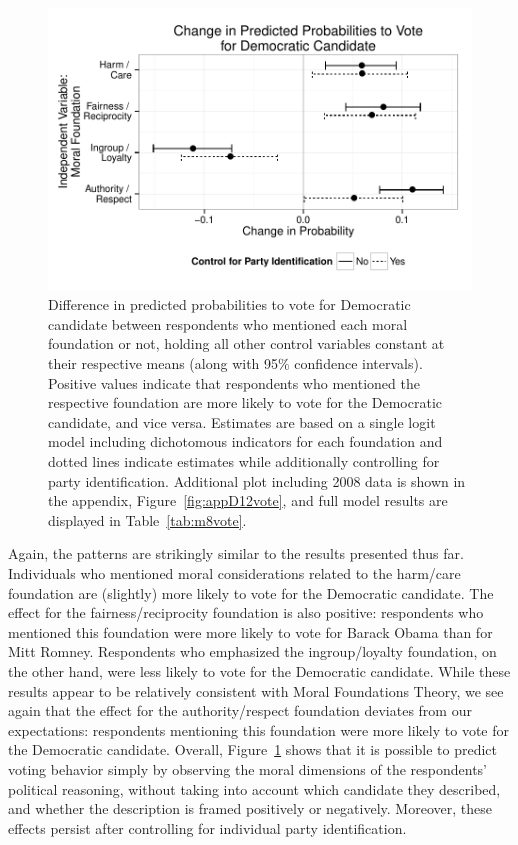 \documentclass[12pt]{article}
\begin{document}
\begin{figure}[h]\centering
\includegraphics[scale=.9]{../calc/fig/fig8vote.pdf}
\caption{Difference in predicted probabilities to vote for Democratic candidate between respondents who mentioned each moral foundation or not, holding all other control variables constant at their respective means (along with 95\% confidence intervals). Positive values indicate that respondents who mentioned the respective foundation are more likely to vote for the Democratic candidate, and vice versa. Estimates are based on a single logit model including dichotomous indicators for each foundation and dotted lines indicate estimates while additionally controlling for party identification. Additional plot including 2008 data is shown in the appendix, Figure~\ref{fig:appD12vote}, and full model results are displayed in Table~\ref{tab:m8vote}.}\label{fig:8vote}
\end{figure}

Again, the patterns are strikingly similar to the results presented thus far. Individuals who mentioned moral considerations related to the harm/care foundation are (slightly) more likely to vote for the Democratic candidate. The effect for the fairness/reciprocity foundation is also positive: respondents who mentioned this foundation were more likely to vote for Barack Obama than for Mitt Romney. Respondents who emphasized the ingroup/loyalty foundation, on the other hand, were less likely to vote for the Democratic candidate. While these results appear to be relatively consistent with Moral Foundations Theory, we see again that the effect for the authority/respect foundation deviates from our expectations: respondents mentioning this foundation were more likely to vote for the Democratic candidate. Overall, Figure~\ref{fig:8vote} shows that it is possible to predict voting behavior simply by observing the moral dimensions of the respondents' political reasoning, without taking into account which candidate they described, and whether the description is framed positively or negatively. Moreover, these effects persist after controlling for individual party identification.
\end{document}
